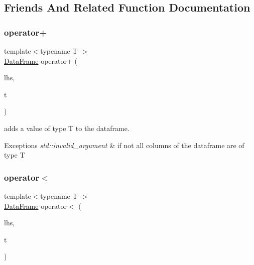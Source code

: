 \subsection{Friends And Related Function Documentation}
\mbox{\label{classDataFrame_af0bd28935e605ba646d407b02e0a5850}} 
\subsubsection{\texorpdfstring{operator+}{operator+}}
{\footnotesize\ttfamily template$<$typename T $>$ \\
\hyperlink{classDataFrame}{Data\+Frame} operator+ (\begin{DoxyParamCaption}\item[{const \hyperlink{classDataFrame}{Data\+Frame} \&}]{lhs,  }\item[{const T \&}]{t }\end{DoxyParamCaption})\hspace{0.3cm}{\ttfamily [friend]}}



adds a value of type T to the dataframe. 


\begin{DoxyExceptions}{Exceptions}
{\em std\+::invalid\+\_\+argument} & if not all columns of the dataframe are of type T \\
\hline
\end{DoxyExceptions}
\mbox{\label{classDataFrame_a8c08b940f5d6a095ac079ef277133c1a}} 
\subsubsection{\texorpdfstring{operator$<$}{operator<}}
{\footnotesize\ttfamily template$<$typename T $>$ \\
\hyperlink{classDataFrame}{Data\+Frame} operator$<$ (\begin{DoxyParamCaption}\item[{const \hyperlink{classDataFrame}{Data\+Frame} \&}]{lhs,  }\item[{const T \&}]{t }\end{DoxyParamCaption})\hspace{0.3cm}{\ttfamily [friend]}}



